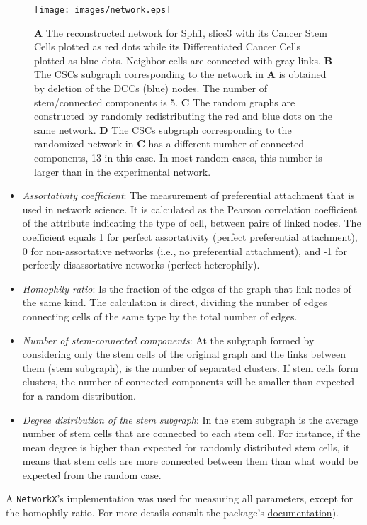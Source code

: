 \documentclass[fleqn,10pt]{wlscirep}
\begin{document}
\begin{figure}[h!]
        \centering
        \texttt{[image: images/network.eps]}
    \caption{{\bf A} The reconstructed network for {\textsf Sph1, slice3} with its Cancer Stem Cells plotted as red dots while its Differentiated Cancer Cells plotted as blue dots. Neighbor cells are connected with gray links. {\bf B} The CSCs subgraph corresponding to the network in {\bf A} is obtained by deletion of the DCCs (blue) nodes. The number of stem/connected components is 5. {\bf C} The random graphs are constructed by randomly redistributing the red and blue dots on the same network. {\bf D} The  CSCs subgraph corresponding to the randomized network in {\bf C} has a different number of connected components, 13 in this case. In most random cases, this number is larger than in the experimental network. }
    \label{fig: Delaunay sph1 slice 3}
\end{figure}


\begin{itemize}
    \item \emph{Assortativity coefficient}: The measurement of preferential attachment that is used in network science. It is calculated as the Pearson correlation coefficient of the attribute indicating the type of cell, between pairs of linked nodes. The coefficient equals 1 for perfect assortativity (perfect preferential attachment), 0 for non-assortative networks (i.e., no preferential attachment), and -1 for perfectly disassortative networks (perfect heterophily).
    \item \emph{Homophily ratio}: Is the fraction of the edges of the graph that link nodes of the same kind. The calculation is direct, dividing the number of edges connecting cells of the same type by the total number of edges. 
    \item \emph{Number of stem-connected components}: At the subgraph formed by considering only the stem cells of the original graph and the links between them (stem subgraph), is the number of separated clusters. If stem cells form clusters, the number of connected components will be smaller than expected for a random distribution.
    \item \emph{Degree distribution of the stem subgraph}: In the stem subgraph is the average number of stem cells that are connected to each stem cell. For instance, if the mean degree is higher than expected for randomly distributed stem cells, it means that stem cells are more connected between them than what would be expected from the random case.
\end{itemize}
%
A \lstinline{NetworkX}'s\cite{SciPyProceedings_11} implementation was used for measuring all parameters, except for the homophily ratio. For more details consult the package's \href{https://networkx.org/documentation/stable/reference/algorithms/generated/networkx.algorithms.assortativity.attribute_assortativity_coefficient.html#networkx.algorithms.assortativity.attribute_assortativity_coefficient}{documentation}). 
\end{document}
